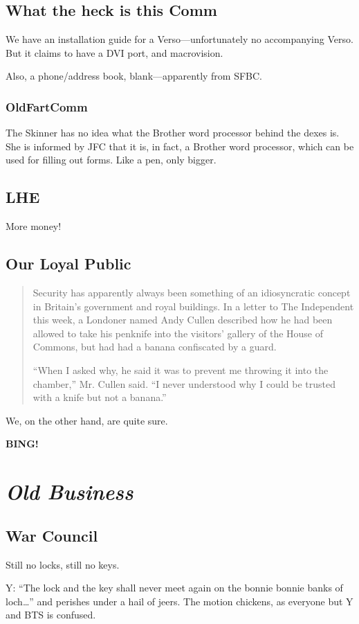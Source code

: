 \documentclass[10pt]{article}
\newcommand{\bing}{{\bf BING!} }
\newcommand{\goto}[1]{\bing \vskip 12pt \section*{{\em{#1}}}}
\begin{document}
\subsection*{What the heck is this Comm}

We have an installation guide for a Verso---unfortunately no
accompanying Verso.  But it claims to have a DVI port, and
macrovision.

Also, a phone/address book, blank---apparently from SFBC.

\subsubsection*{OldFartComm}
The Skinner has no idea what the Brother word processor behind the
dexes is.  She is informed by JFC that it is, in fact, a Brother word
processor, which can be used for filling out forms.  Like a pen, only
bigger.


\subsection*{LHE}
More money!

\subsection*{Our Loyal Public}
\begin{quotation}
Security has apparently always been something of an idiosyncratic
concept in Britain's government and royal buildings. In a letter to
The Independent this week, a Londoner named Andy Cullen described how
he had been allowed to take his penknife into the visitors' gallery of
the House of Commons, but had had a banana confiscated by a guard.

``When I asked why, he said it was to prevent me throwing it into the
chamber,'' Mr. Cullen said. ``I never understood why I could be trusted
with a knife but not a banana.''
\end{quotation}

We, on the other hand, are quite sure.

\goto{Old Business}
\subsection*{War Council}
Still no locks, still no keys.

Y: ``The lock and the key shall never meet again on the bonnie bonnie
banks of loch\dots'' and perishes under a hail of jeers.  The motion
chickens, as everyone but Y and BTS is confused.
\end{document}
